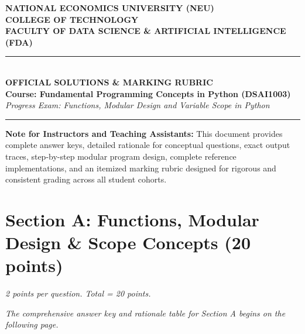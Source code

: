 \documentclass[11pt,a4paper]{article}
\begin{document}
\begin{center}
  {\Large\textbf{NATIONAL ECONOMICS UNIVERSITY (NEU)}}\\[0.15cm]
  {\large\textbf{COLLEGE OF TECHNOLOGY}}\\[0.10cm]
  {\large\textbf{FACULTY OF DATA SCIENCE \& ARTIFICIAL INTELLIGENCE (FDA)}}\\[0.25cm]
  \rule{\textwidth}{1.2pt}\\[0.3cm]
  {\LARGE\bfseries\color{primaryblue}OFFICIAL SOLUTIONS \& MARKING RUBRIC}\\[0.15cm]
  {\large\textbf{Course: Fundamental Programming Concepts in Python (DSAI1003)}}\\[0.15cm]
  {\normalsize\textit{Progress Exam: Functions, Modular Design and Variable Scope in Python}}\\[0.2cm]
  \rule{\textwidth}{0.6pt}
\end{center}

\vspace{0.2cm}

\begin{tcolorbox}[colback=green!8, colframe=correctgreen, arc=1.5mm]
\small
\textbf{Note for Instructors and Teaching Assistants:}
This document provides complete answer keys, detailed rationale for conceptual questions, exact output traces, step-by-step modular program design, complete reference implementations, and an itemized marking rubric designed for rigorous and consistent grading across all student cohorts.
\end{tcolorbox}

\vspace{0.3cm}

\section*{Section A: Functions, Modular Design \& Scope Concepts (20 points)}
\textit{2 points per question. Total = 20 points.}

\vfill
\begin{center}
  \textit{\color{darkgray}The comprehensive answer key and rationale table for Section A begins on the following page.}
\end{center}
\vfill

\newpage
\end{document}
